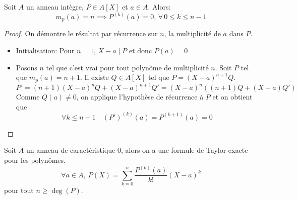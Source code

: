 \begin{lemma}
	Soit $A$ un anneau intègre, $P \in A[X]$ et $a \in A$.
	Alors:
	$$ m_p(a) = n \implies P^{(k)}(a) = 0 , \, \forall\, 0 \leq k \leq n-1$$
\end{lemma}

\begin{proof}
	On démontre le résultat par récurrence sur $n$, la multiplicité de $a$ dans $P$.
	\begin{itemize}
		\item Initialisation: Pour $n = 1$, $X-a \mid P$ et donc $P(a) = 0$
		\item Posons $n$ tel que c'est vrai pour tout polynôme de multiplicité $n$.
		      Soit $P$ tel que $m_p(a) = n+1$. Il existe $Q \in A[X]$ tel que $P = (X-a)^{n+1}Q$.
		      $$P' = (n+1)(X-a)^nQ + (X-a)^{n+1}Q' = (X-a)^n((n+1)Q + (X-a)Q')$$
		      Comme $Q(a) \neq 0$, on applique l'hypothèse de récurrence à $P$ et on obtient que
		      $$ \forall k \leq n-1 \quad (P')^{(k)}(a) = P^{(k+1)}(a) = 0 $$
	\end{itemize}
\end{proof}

\begin{prop}[Admis]
	Soit $A$ un anneau de caractéristique $0$, alors on a une formule de Taylor exacte pour les polynômes.
	$$\forall a \in A, \  P(X) = \sum\limits_{k=0}^n \frac{P^{(k)}(a)}{k!}(X-a)^k $$
	pour tout $n \geq \deg(P)$.
\end{prop}


